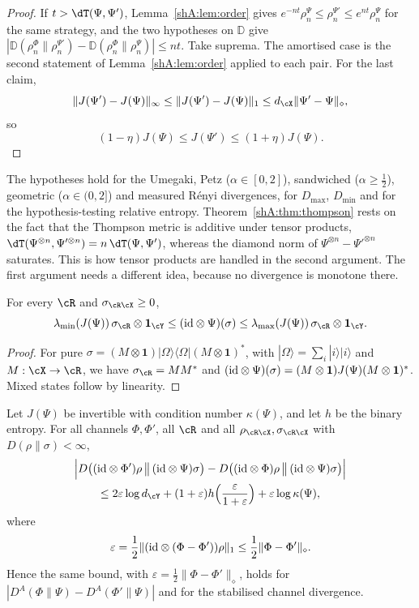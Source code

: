 \begin{proof}
If $t>\dT(\Psi,\Psi')$, Lemma~\ref{shA:lem:order} gives $e^{-nt}\rho^{\Psi}_n\le\rho^{\Psi'}_n\le e^{nt}\rho^\Psi_n$ for the same strategy, and the two hypotheses on $\mathbb D$ give $|\mathbb D(\rho^\Phi_n\|\rho^{\Psi'}_n)-\mathbb D(\rho^\Phi_n\|\rho^\Psi_n)|\le nt$. Take suprema. The amortised case is the second statement of Lemma~\ref{shA:lem:order} applied to each pair. For the last claim,
\[
\|J(\Psi')-J(\Psi)\|_\infty\le\|J(\Psi')-J(\Psi)\|_1\le d_\cX\|\Psi'-\Psi\|_\diamond,
\]
so
\[
(1-\eta)J(\Psi)\le J(\Psi')\le(1+\eta)J(\Psi).
\]
\end{proof}

The hypotheses hold for the Umegaki, Petz ($\alpha\in[0,2]$), sandwiched ($\alpha\ge\frac12$), geometric ($\alpha\in(0,2]$) and measured R\'enyi divergences, for $D_{\max}$, $D_{\min}$ and for the hypothesis-testing relative entropy. Theorem~\ref{shA:thm:thompson} rests on the fact that the Thompson metric is additive under tensor products, $\dT(\Psi^{\otimes n},\Psi'^{\otimes n})=n\,\dT(\Psi,\Psi')$, whereas the diamond norm of $\Psi^{\otimes n}-\Psi'^{\otimes n}$ saturates. This is how tensor products are handled in the second argument. The first argument needs a different idea, because no divergence is monotone there.

\begin{lemma}\label{shA:lem:sandwichchoi}
For every $\cR$ and $\sigma_{\cR\cX}\ge0$,
\[
\lambda_{\min}(J(\Psi))\,\sigma_\cR\otimes\mathbf 1_\cY\le(\id\otimes\Psi)(\sigma)\le\lambda_{\max}(J(\Psi))\,\sigma_\cR\otimes\mathbf 1_\cY.
\]
\end{lemma}

\begin{proof}
For pure $\sigma=(M\otimes\mathbf 1)|\Omega\rangle\langle\Omega|(M\otimes\mathbf 1)^*$, with $|\Omega\rangle=\sum_i|i\rangle|i\rangle$ and $M:\cX\to\cR$, we have $\sigma_\cR=MM^*$ and $(\mathrm{id}\otimes\Psi)(\sigma)=(M\otimes\mathbf 1)J(\Psi)(M\otimes\mathbf 1)^*$. Mixed states follow by linearity.
\end{proof}

\begin{theorem}\label{shA:thm:firstarg}
Let $J(\Psi)$ be invertible with condition number $\kappa(\Psi)$, and let $h$ be the binary entropy. For all channels $\Phi,\Phi'$, all $\cR$ and all $\rho_{\cR\cX},\sigma_{\cR\cX}$ with $D(\rho\|\sigma)<\infty$,
\begin{multline*}
\Big|D\big((\id\otimes\Phi')\rho\,\big\|\,(\id\otimes\Psi)\sigma\big)-D\big((\id\otimes\Phi)\rho\,\big\|\,(\id\otimes\Psi)\sigma\big)\Big|\\
\le2\varepsilon\log d_\cY+(1+\varepsilon)h\Big(\frac{\varepsilon}{1+\varepsilon}\Big)+\varepsilon\log\kappa(\Psi),
\end{multline*}
where
\[
\varepsilon=\frac12\|(\mathrm{id}\otimes(\Phi-\Phi'))\rho\|_1\le\frac12\|\Phi-\Phi'\|_\diamond.
\]
Hence the same bound, with $\varepsilon=\frac12\|\Phi-\Phi'\|_\diamond$, holds for $|D^A(\Phi\|\Psi)-D^A(\Phi'\|\Psi)|$ and for the stabilised channel divergence.
\end{theorem}

